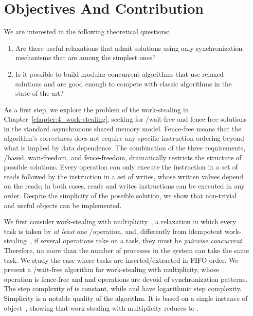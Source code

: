 \section{\label{section:Objectives}Objectives And Contribution}

We are interested in the following theoretical questions:

\begin{enumerate}
  \item Are there useful relaxations that admit solutions using only synchronization mechanisms that are among the simplest ones?
  \item Is it possible to build modular concurrent algorithms that use relaxed solutions and are good enough to compete with classic algorithms in the state-of-the-art?
\end{enumerate}

As a first step, we explore the problem of the work-stealing in Chapter~\ref{chapter:4_work-stealing}, seeking for \R/\W wait-free and fence-free solutions in the standard asynchronous shared memory model. Fence-free means that the algorithm's correctness does not require any specific instruction ordering beyond what is implied by data dependence. The combination of the three requirements, \R/\W based, wait-freedom, and fence-freedom, dramatically restricts the structure of possible solutions. Every operation can only execute the \R instruction in a set of reads followed by the \W instruction in a set of writes, whose written values depend on the reads; in both cases, reads and writes instructions can be executed in any order. Despite the simplicity of the possible solution, we show that non-trivial and useful objects can be implemented.

We first consider work-stealing with multiplicity~\cite{DBLP_journals_dc_CastanedaRR23}, a relaxation in which every task is taken by \textit{at least} one \Take/\Steal operation, and, differently from idempotent work-stealing~\cite{maged.vechev.2009}, if several operations take on a task, they must be \textit{pairwise concurrent}. Therefore, no more than the number of processes in the system can take the same task. We study the case where tasks are inserted/extracted in FIFO order. We present a \R/\W wait-free algorithm for work-stealing with multiplicity, whose \Put operation is fence-free and \Take and \Steal operations are devoid of \RAW synchronization patterns. The step complexity of \Put is constant, while \Take and \Steal have logarithmic step complexity. Simplicity is a notable quality of the algorithm. It is based on a single instance of \MaxReg object~\cite{DBLP_journals_jacm_AspnesAC12,DBLP_journals_siamcomp_JayantiTT00}, showing that work-stealing with multiplicity reduces to \MaxReg.

